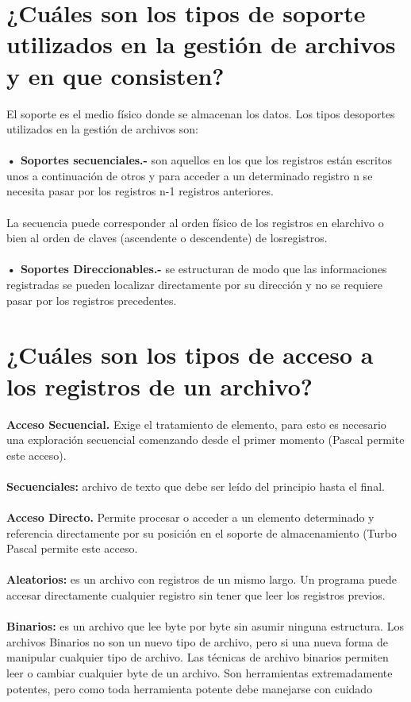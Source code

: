 \documentclass{article}
\begin{document}
\section{¿Cuáles son los tipos de soporte utilizados en la gestión de archivos y en que consisten?}
    El soporte es el medio físico donde se almacenan los datos. Los tipos desoportes utilizados en la gestión de archivos son:
    \\\\
    \textbf{• Soportes secuenciales.-} son aquellos en los que los registros están escritos unos a continuación de otros y para acceder a un determinado registro n se necesita pasar por los registros n-1 registros anteriores.
    \\\\
    La secuencia puede corresponder al orden físico de los registros en elarchivo o bien al orden de claves (ascendente o descendente) de losregistros.
    \\\\
    \textbf{• Soportes Direccionables.-} se estructuran de modo que las informaciones registradas se pueden localizar directamente por su dirección y no se requiere pasar por los registros precedentes.

    

\section{¿Cuáles son los tipos de acceso a los registros de un archivo?}
    \textbf{Acceso Secuencial.} Exige el tratamiento de elemento, para esto es necesario una exploración secuencial comenzando desde el primer momento (Pascal permite este acceso).
    \\\\
    \textbf{Secuenciales:}  archivo de texto que debe ser leído del principio hasta el final.
    \\\\
    \textbf{Acceso Directo.} Permite procesar o acceder a un elemento determinado y referencia directamente por su posición en el soporte de almacenamiento (Turbo Pascal permite este acceso.
    \\\\
    \textbf{Aleatorios:}  es un archivo con registros de un mismo largo.  Un programa puede accesar directamente cualquier registro sin tener que leer los registros previos.
    \\\\
    \textbf{Binarios:}  es un archivo que lee byte por byte sin asumir ninguna estructura.
    Los archivos Binarios no son un nuevo tipo de archivo, pero si una nueva forma de manipular cualquier tipo de archivo. Las técnicas de archivo binarios permiten leer o cambiar cualquier byte de un archivo. Son herramientas extremadamente potentes, pero como toda herramienta potente debe manejarse con cuidado
\end{document}
